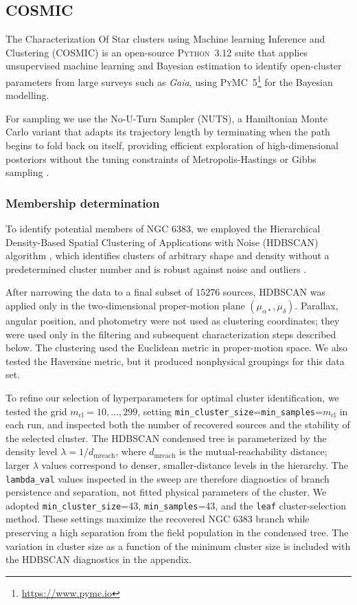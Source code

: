 \documentclass{aa}
\begin{document}
\subsection{\sc COSMIC}
The Characterization Of Star clusters using Machine learning Inference and Clustering (\textsc{COSMIC}) is an open-source \textsc{Python}~3.12 suite that applies unsupervised machine learning and Bayesian estimation to identify open-cluster parameters from large surveys such as \textit{Gaia}, using \textsc{PyMC}~5\footnote{\url{https://www.pymc.io}} for the Bayesian modelling.

For sampling we use the No-U-Turn Sampler (NUTS), a Hamiltonian Monte Carlo variant that adapts its trajectory length by terminating when the path begins to fold back on itself, providing efficient exploration of high-dimensional posteriors without the tuning constraints of Metropolis-Hastings or Gibbs sampling \citep{phan2019composable}.

\subsubsection{Membership determination}\label{subsubsec:membership}

To identify potential members of NGC 6383, we employed the Hierarchical Density-Based Spatial Clustering of Applications with Noise (\textsc{HDBSCAN}) algorithm \citep{10.1007/978-3-642-37456-2_14,McInnes2017}, which identifies clusters of arbitrary shape and density without a predetermined cluster number and is robust against noise and outliers \citep{2021A&A...646A.104H}.

After narrowing the data to a final subset of $15276$ sources, \textsc{HDBSCAN} was applied only in the two-dimensional proper-motion plane $(\mu_{\alpha*},\mu_\delta)$. Parallax, angular position, and photometry were not used as clustering coordinates; they were used only in the filtering and subsequent characterization steps described below. The clustering used the Euclidean metric in proper-motion space. We also tested the Haversine metric, but it produced nonphysical groupings for this data set.

To refine our selection of hyperparameters for optimal cluster identification, we tested the grid $m_{\mathrm{cl}}=10,\ldots,299$, setting \texttt{min\_cluster\_size}=\texttt{min\_samples}=$m_{\mathrm{cl}}$ in each run, and inspected both the number of recovered sources and the stability of the selected cluster. The \textsc{HDBSCAN} condensed tree is parameterized by the density level $\lambda=1/d_{\mathrm{mreach}}$, where $d_{\mathrm{mreach}}$ is the mutual-reachability distance; larger $\lambda$ values correspond to denser, smaller-distance levels in the hierarchy. The \texttt{lambda\_val} values inspected in the sweep are therefore diagnostics of branch persistence and separation, not fitted physical parameters of the cluster. We adopted \texttt{min\_cluster\_size}=43, \texttt{min\_samples}=43, and the \texttt{leaf} cluster-selection method. These settings maximize the recovered NGC 6383 branch while preserving a high separation from the field population in the condensed tree. The variation in cluster size as a function of the minimum cluster size is included with the HDBSCAN diagnostics in the appendix.
\end{document}
